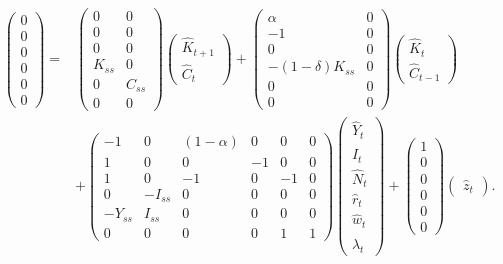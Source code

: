 \documentclass[11pt]{article}
\numberwithin{equation}{section} %
\numberwithin{figure}{section} %
\numberwithin{table}{section} %
\theoremstyle{definition}
\begin{document}
\begin{align*}
    \begin{pmatrix}
        0 \\ 0 \\ 0 \\ 0 \\ 0 \\ 0
    \end{pmatrix} = &\begin{pmatrix}
        0 & 0 \\
        0 & 0 \\
        0 & 0 \\
        K_{ss} & 0 \\
        0 & C_{ss} \\
        0 & 0
    \end{pmatrix} \begin{pmatrix}
        \hat{K}_{t+1} \\
        \hat{C}_t
    \end{pmatrix} + \begin{pmatrix}
        \alpha & 0 \\
        -1 & 0 \\
        0 & 0 \\
        -(1-\delta) K_{ss} & 0 \\
        0 & 0 \\
        0 & 0
    \end{pmatrix} \begin{pmatrix}
        \hat{K}_t \\
        \hat{C}_{t-1}
    \end{pmatrix} \\
    &+ \begin{pmatrix}
        -1 & 0 & (1-\alpha) & 0 & 0 & 0 \\
        1 & 0 & 0 & -1 & 0 & 0 \\
        1 & 0 & -1 & 0 & -1 & 0 \\
        0 & -I_{ss} & 0 & 0 & 0 & 0 \\
        -Y_{ss} & I_{ss} & 0 & 0 & 0 & 0 \\
        0 & 0 & 0 & 0 & 1 & 1
    \end{pmatrix} \begin{pmatrix}
        \hat{Y}_t \\
        \hat{I}_t \\
        \hat{N}_t \\
        \hat{r}_t \\
        \hat{w}_t \\
        \hat{\lambda}_t
    \end{pmatrix} + \begin{pmatrix}
         1 \\ 0 \\ 0 \\ 0 \\ 0 \\ 0
    \end{pmatrix} \begin{pmatrix}
        \hat{z}_t
    \end{pmatrix}.
\end{align*}
\end{document}
